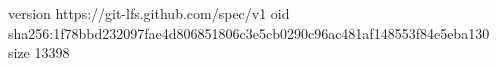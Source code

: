 version https://git-lfs.github.com/spec/v1
oid sha256:1f78bbd232097fae4d806851806c3e5cb0290c96ac481af148553f84e5eba130
size 13398
